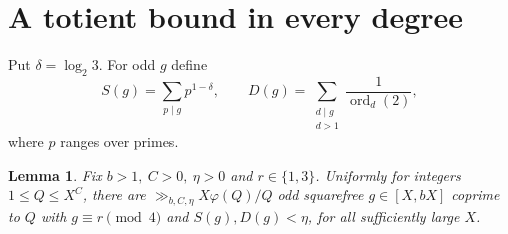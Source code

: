 \documentclass[11pt]{article}
\newtheorem{lemma}[theorem]{Lemma}
\newcommand{\ord}{\operatorname{ord}}
\begin{document}
\section{A totient bound in every degree}
\label{sec:totient-density}
Put \(\delta=\log_2 3\). For odd \(g\) define
\[
 S(g)=\sum_{p\mid g}p^{1-\delta},\qquad
 D(g)=\sum_{\substack{d\mid g\\d>1}}\frac1{\ord_d(2)} ,
\]
where \(p\) ranges over primes.

\begin{lemma}\label{lem:many-gap-moduli}
Fix \(b>1,\ C>0,\ \eta>0\) and \(r\in\{1,3\}\). Uniformly for
integers \(1\le Q\le X^C\), there are
\(\gg_{b,C,\eta} X\varphi(Q)/Q\) odd squarefree
\(g\in[X,bX]\) coprime to \(Q\) with \(g\equiv r\pmod4\) and
\(S(g),D(g)<\eta\), for all sufficiently large \(X\).
\end{lemma}
\end{document}
